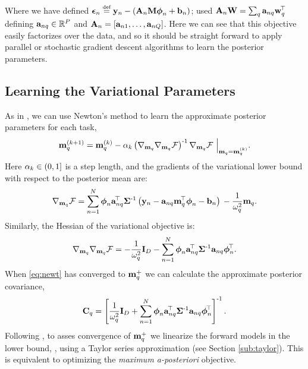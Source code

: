 Where we have defined $\errorn \defeq  \outs_n - (\Linmat_n\pWeights\feats_n + \intcpt_n) $; 
 used $\mathbf{A}_n\mathbf{W} = \sum_q \mathbf{a}_{nq}
\mathbf{w}_q^{\!\top}$ defining
$\mathbf{a}_{nq} \in \mathbb{R}^{P}$ and $\mathbf{A}_n = \left[{\mathbf{a}_{n1}, \ldots,
    \mathbf{a}_{nQ}}\right]$. Here we can see that this objective easily factorizes over the
data, and so it should be straight forward to apply parallel or stochastic
gradient descent algorithms to learn the posterior parameters.


\subsection{Learning the Variational Parameters}

As in \citet{steinberg-bonilla-nips-2014}, we can use Newton's method to learn
the approximate posterior parameters for each task,
\begin{equation}
    \mathbf{m}_{q}^{(k+1)} = \mathbf{m}_{q}^{(k)} - \alpha_k
        \left({\nabla_{\mathbf{m}_q} \nabla_{\mathbf{m}_q} \mathcal{F}}\right)^{\text{-}1}
        \nabla_{\mathbf{m}_q} \mathcal{F} ~ \Big|_{\mathbf{m}_q = \mathbf{m}_{q}^{(k)}}.
        \label{eq:newt}
\end{equation}
Here $\alpha_k \in (0, 1]$ is a step length, and the gradients of the 
variational lower bound with respect to the posterior mean are:
\begin{equation}
    \nabla_{\mathbf{m}_q} \mathcal{F} = \sum^N_{n=1} \boldsymbol\phi_n \mathbf{a}_{nq}^{\!\top}
        \mathbf{\Sigma}^{\text{-}1}
        \left({\mathbf{y}_n - \mathbf{a}_{nq}\mathbf{m}_q^{\!\top}\boldsymbol\phi_n - \mathbf{b}_n}\right)  \\
        - \frac{1}{\omega^2_q} \mathbf{m}_q \text{.}
 \end{equation}     
%
Similarly, the Hessian of the variational objective is: 
\begin{equation}     
    \nabla_{\mathbf{m}_q} \nabla_{\mathbf{m}_q} \mathcal{F} =
       - \frac{1}{\omega^2_q}  \mathbf{I}_{D}
        - \sum^N_{n=1} \boldsymbol\phi_n\mathbf{a}_{nq}^{\!\top}\mathbf{\Sigma}^{\text{-}1}
        \mathbf{a}_{nq}\boldsymbol\phi_n^{\!\top}.
\end{equation}
When \eqref{eq:newt} has converged to $\mathbf{m}_q^{+}$ we can calculate the
approximate posterior covariance,
\begin{equation}
    \mathbf{C}_q 
    = \left[{ \frac{1}{\omega^2_q} \mathbf{I}_{D}
        + \sum^N_{n=1} \boldsymbol\phi_n\mathbf{a}_{nq}^{\!\top}\mathbf{\Sigma}^{\text{-}1}
        \mathbf{a}_{nq}\boldsymbol\phi_n^{\!\top}}\right]^{\text{-}1}.
\end{equation}
Following \citet{steinberg-bonilla-nips-2014}, to asses convergence of
$\mathbf{m}_q^{+}$ we linearize the forward models in the lower bound, \Fengy,
using a Taylor series approximation (see Section \ref{sub:taylor}). This is
equivalent to optimizing the \emph{maximum a-posteriori} objective.
